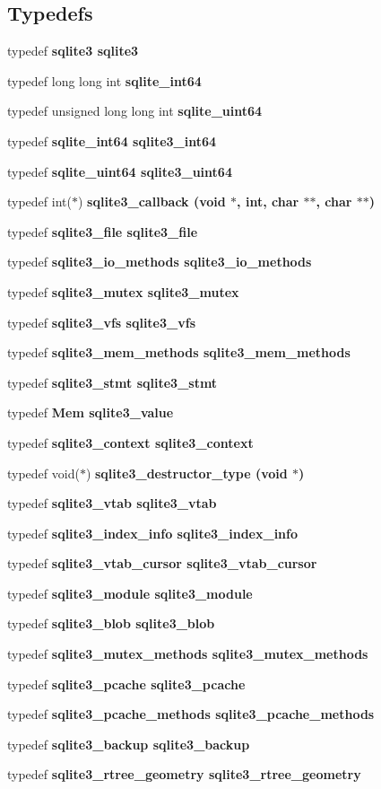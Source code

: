 \subsection*{Typedefs}
\begin{CompactItemize}
\item 
typedef \bf{sqlite3} \bf{sqlite3}
\item 
typedef long long int \bf{sqlite\_\-int64}
\item 
typedef unsigned long long int \bf{sqlite\_\-uint64}
\item 
typedef \bf{sqlite\_\-int64} \bf{sqlite3\_\-int64}
\item 
typedef \bf{sqlite\_\-uint64} \bf{sqlite3\_\-uint64}
\item 
typedef int($\ast$) \bf{sqlite3\_\-callback} (void $\ast$, int, char $\ast$$\ast$, char $\ast$$\ast$)
\item 
typedef \bf{sqlite3\_\-file} \bf{sqlite3\_\-file}
\item 
typedef \bf{sqlite3\_\-io\_\-methods} \bf{sqlite3\_\-io\_\-methods}
\item 
typedef \bf{sqlite3\_\-mutex} \bf{sqlite3\_\-mutex}
\item 
typedef \bf{sqlite3\_\-vfs} \bf{sqlite3\_\-vfs}
\item 
typedef \bf{sqlite3\_\-mem\_\-methods} \bf{sqlite3\_\-mem\_\-methods}
\item 
typedef \bf{sqlite3\_\-stmt} \bf{sqlite3\_\-stmt}
\item 
typedef \bf{Mem} \bf{sqlite3\_\-value}
\item 
typedef \bf{sqlite3\_\-context} \bf{sqlite3\_\-context}
\item 
typedef void($\ast$) \bf{sqlite3\_\-destructor\_\-type} (void $\ast$)
\item 
typedef \bf{sqlite3\_\-vtab} \bf{sqlite3\_\-vtab}
\item 
typedef \bf{sqlite3\_\-index\_\-info} \bf{sqlite3\_\-index\_\-info}
\item 
typedef \bf{sqlite3\_\-vtab\_\-cursor} \bf{sqlite3\_\-vtab\_\-cursor}
\item 
typedef \bf{sqlite3\_\-module} \bf{sqlite3\_\-module}
\item 
typedef \bf{sqlite3\_\-blob} \bf{sqlite3\_\-blob}
\item 
typedef \bf{sqlite3\_\-mutex\_\-methods} \bf{sqlite3\_\-mutex\_\-methods}
\item 
typedef \bf{sqlite3\_\-pcache} \bf{sqlite3\_\-pcache}
\item 
typedef \bf{sqlite3\_\-pcache\_\-methods} \bf{sqlite3\_\-pcache\_\-methods}
\item 
typedef \bf{sqlite3\_\-backup} \bf{sqlite3\_\-backup}
\item 
typedef \bf{sqlite3\_\-rtree\_\-geometry} \bf{sqlite3\_\-rtree\_\-geometry}
\end{CompactItemize}

